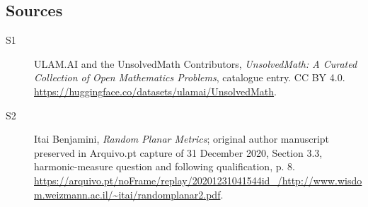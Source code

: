 \documentclass[11pt]{article}
\begin{document}
\subsection{Sources}
\begin{description}
\item[\hypertarget{source:statement:1}{S1}] ULAM.AI and the UnsolvedMath Contributors, \emph{UnsolvedMath: A Curated Collection of Open Mathematics Problems}, catalogue entry. CC BY 4.0. \url{https://huggingface.co/datasets/ulamai/UnsolvedMath}.
\item[\hypertarget{source:statement:2}{S2}] Itai Benjamini, \emph{Random Planar Metrics}; original author manuscript preserved in Arquivo.pt capture of 31 December 2020, Section 3.3, harmonic-measure question and following qualification, p. 8. \url{https://arquivo.pt/noFrame/replay/20201231041544id_/http://www.wisdom.weizmann.ac.il/~itai/randomplanar2.pdf}.
\end{description}
\label{end:statement}
\end{document}
